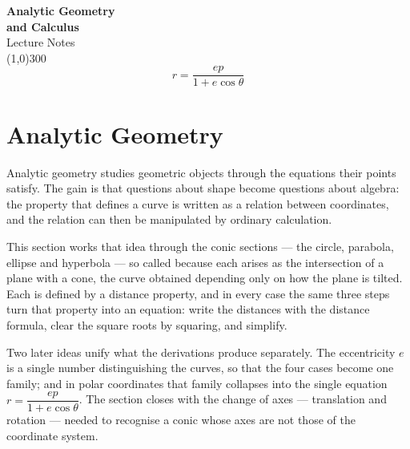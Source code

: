 \documentclass[11pt,a4paper]{article}
\theoremstyle{definition}
\begin{document}
\begin{titlepage}
\begin{center}
\vspace*{3cm}
{\Huge\bfseries Analytic Geometry\\[0.35cm] and Calculus}\\[1.2cm]
{\large Lecture Notes}\\[2.5cm]
\line(1,0){300}\\[1.5cm]
$$r=\frac{ep}{1+e\cos\theta}$$
\end{center}
\end{titlepage}

\tableofcontents
\thispagestyle{empty}
\clearpage
\setcounter{page}{1}

\section{Analytic Geometry}

Analytic geometry studies geometric objects through the equations their points
satisfy. The gain is that questions about shape become questions about algebra:
the property that defines a curve is written as a relation between coordinates,
and the relation can then be manipulated by ordinary calculation.

This section works that idea through the conic sections --- the circle,
parabola, ellipse and hyperbola --- so called because each arises as the
intersection of a plane with a cone, the curve obtained depending only on how
the plane is tilted. Each is defined by a distance property, and in every case
the same three steps turn that property into an equation: write the distances
with the distance formula, clear the square roots by squaring, and simplify.

Two later ideas unify what the derivations produce separately. The eccentricity
$e$ is a single number distinguishing the curves, so that the four cases become
one family; and in polar coordinates that family collapses into the single
equation $r = \dfrac{ep}{1 + e\cos\theta}$. The section closes with the change
of axes --- translation and rotation --- needed to recognise a conic whose axes
are not those of the coordinate system.
\end{document}
